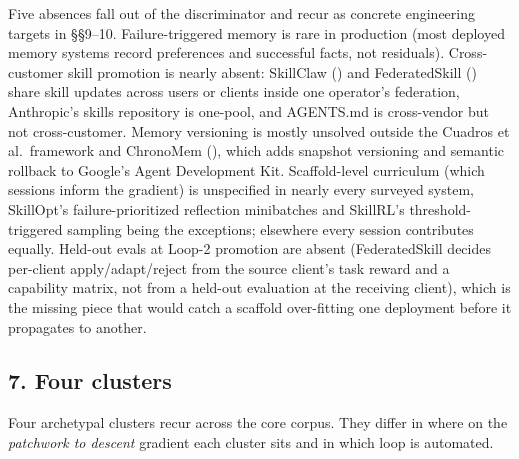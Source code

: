 \documentclass[
]{article}
\begin{document}
Five absences fall out of the discriminator and recur as concrete
engineering targets in §§9--10. Failure-triggered memory is rare in
production (most deployed memory systems record preferences and
successful facts, not residuals). Cross-customer skill promotion is
nearly absent: SkillClaw () and FederatedSkill () share skill updates across users or clients inside one
operator's federation, Anthropic's skills repository is one-pool, and
AGENTS.md is cross-vendor but not cross-customer. Memory versioning is
mostly unsolved outside the Cuadros et al.~framework and ChronoMem
(), which adds snapshot
versioning and semantic rollback to Google's Agent Development Kit.
Scaffold-level curriculum (which sessions inform the gradient) is
unspecified in nearly every surveyed system, SkillOpt's
failure-prioritized reflection minibatches and SkillRL's
threshold-triggered sampling being the exceptions; elsewhere every
session contributes equally. Held-out evals at Loop-2 promotion are
absent (FederatedSkill decides per-client apply/adapt/reject from the
source client's task reward and a capability matrix, not from a held-out
evaluation at the receiving client), which is the missing piece that
would catch a scaffold over-fitting one deployment before it propagates
to another.

\subsection{7. Four clusters}\label{four-clusters}

Four archetypal clusters recur across the core corpus. They differ in
where on the \emph{patchwork to descent} gradient each cluster sits and
in which loop is automated.
\end{document}
